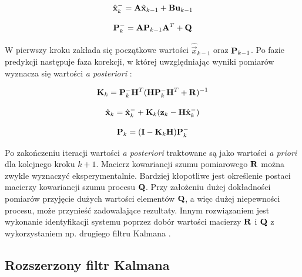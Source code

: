 \begin{equation}
\label{equ:Filtr_Kalmana_faza_predykcji_stan}
	\hat{\vec{x}}_k^- = \matr{A} \hat{\vec{x}}_{k-1} + \matr{B} \vec{u}_{k - 1}
\end{equation}

\begin{equation}
\label{equ:Filtr_Kalmana_faza_predykcji_macierz_kowariancji_bledow}
	\mathbf{P}_k^- = \mathbf{A} \mathbf{P}_{k-1} \mathbf{A}^T + \mathbf{Q}
\end{equation}

W pierwszy kroku zakłada się początkowe wartości $\hat{\vec{x}}_{k-1}$ oraz $\mathbf{P}_{k-1}$. Po fazie predykcji następuje faza korekcji, w której uwzględniając wyniki pomiarów wyznacza się wartości \textit{a posteriori} \cite{Welch1995}:

\begin{equation}
\label{equ:Filtr_Kalmana_faza_korekcji_wzmocnienie}
	\mathbf{K}_k = \mathbf{P}_k^- \mathbf{H}^T ( \mathbf{H} \mathbf{P}_k^- \mathbf{H}^T +\mathbf{R} ) ^ {-1}
\end{equation}

\begin{equation}
\label{equ:Filtr_Kalmana_faza_korekcji_stan}
	\hat{\vec{x}}_k = \hat{\vec{x}}_k^- + \matr{K}_k(\vec{z}_k - \matr{H}\hat{\vec{x}}_k^-)
\end{equation}

\begin{equation}
\label{equ:Filtr_Kalmana_faza_korekcji_macierz_kowariancji_bledow}
	\mathbf{P}_k = (\mathbf{I} - \mathbf{K}_k \mathbf{H}) \mathbf{P}_k^-
\end{equation}

Po zakończeniu iteracji wartości \textit{a posteriori} traktowane są jako wartości \textit{a priori} dla kolejnego kroku $k+1$. Macierz kowariancji szumu pomiarowego $\mathbf{R}$ można zwykle wyznaczyć eksperymentalnie. Bardziej kłopotliwe jest określenie postaci macierzy kowariancji szumu procesu $\mathbf{Q}$. Przy założeniu dużej dokładności pomiarów przyjęcie dużych wartości elementów $\mathbf{Q}$, a więc dużej niepewności procesu, może przynieść zadowalające rezultaty. Innym rozwiązaniem jest wykonanie identyfikacji systemu poprzez dobór wartości macierzy $\mathbf{R}$ i $\mathbf{Q}$ z wykorzystaniem np. drugiego filtru Kalmana \cite{Welch1995}.

\subsection{Rozszerzony filtr Kalmana}
\label{subsec:Rozszerzony_filtr_Kalmana}

